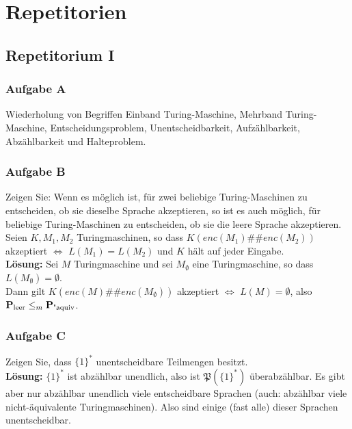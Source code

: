 \section{Repetitorien}

\subsection*{Repetitorium I}
\subsubsection*{Aufgabe A}
    Wiederholung von Begriffen Einband Turing-Maschine, Mehrband Turing-Maschine, Entscheidungsproblem, Unentscheidbarkeit, Aufzählbarkeit, Abzählbarkeit und Halteproblem.

\subsubsection*{Aufgabe B}
    Zeigen Sie: Wenn es möglich ist, für zwei beliebige Turing-Maschinen zu entscheiden, ob sie dieselbe Sprache akzeptieren, so ist es auch möglich, für beliebige Turing-Maschinen zu entscheiden, ob sie die leere Sprache akzeptieren. Seien $K, M_1, M_2$ Turingmaschinen, so dass $K(enc(M_1)\#\#enc(M_2))$ akzeptiert $\Leftrightarrow$ $L(M_1) = L(M_2)$ und $K$ hält auf jeder Eingabe. \\
    \textbf{Lösung:} Sei $M$ Turingmaschine und sei $M_\emptyset$ eine Turingmaschine, so dass $L(M_\emptyset) = \emptyset$. \\
    Dann gilt $K(enc(M)\#\#enc(M_\emptyset))$ akzeptiert $\Leftrightarrow$ $L(M) = \emptyset$, also $\textbf{P}_{\text{leer}} \leq_{m} \textbf{P}_{\text{"aquiv}}$.

\subsubsection*{Aufgabe C}
    Zeigen Sie, dass $\{1\}^*$ unentscheidbare Teilmengen besitzt. \\
    \textbf{Lösung:} $\{1\}^*$ ist abzählbar unendlich, also ist $\mathfrak{P}(\{1\}^*)$ überabzählbar. Es gibt aber nur abzählbar unendlich viele entscheidbare Sprachen (auch: abzählbar viele nicht-äquivalente Turingmaschinen). Also sind einige (fast alle) dieser Sprachen unentscheidbar.

